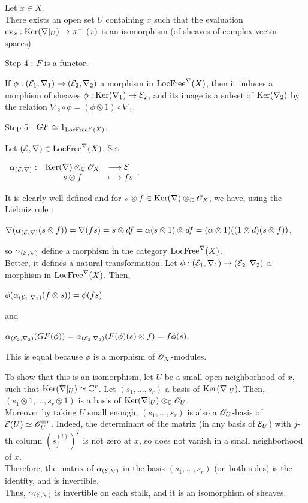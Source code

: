 \begin{mydemo}
\begin{mylemme}
Let $x \in X$.\\
There exists an open set $U$ containing $x$ such that the evaluation $\text{ev}_x : \text{Ker}(\nabla|_U) \to \pi^{-1}(x)$ is an isomorphism (of sheaves of complex vector spaces).
\end{mylemme}


\underline{Step 4} : $F$ is a functor.

\smallskip
If $\phi : (\mathcal{E}_1,\nabla_1) \to (\mathcal{E}_2,\nabla_2)$ a morphism in $\text{LocFree}^\nabla(X)$, then it induces a morphism of sheaves $\phi : \text{Ker}(\nabla_1) \to \mathcal{E}_2$, and its image is a subset of $\text{Ker}(\nabla_2)$ by the relation $\nabla_2 \circ \phi = (\phi\otimes 1)\circ \nabla_1$.


\underline{Step 5} : $GF \simeq 1_{\text{LocFree}^\nabla(X)}$.

\smallskip
Let $(\mathcal{E},\nabla) \in \text{LocFree}^\nabla(X)$. Set
\begin{center}
$\displaystyle \begin{array}{rcll} \alpha_{(\mathcal{E},\nabla)} : & \text{Ker}(\nabla) \otimes_{\mathbb{C}} \mathscr{O}_X & \longrightarrow \mathcal{E} \\ & s \otimes f & \longmapsto fs \end{array}$.
\end{center}
It is clearly well defined and for $s \otimes f \in \text{Ker}(\nabla) \otimes_{\mathbb{C}} \mathscr{O}_X$, we have, using the Liebniz rule :
\begin{center}
$\nabla(\alpha_{(\mathcal{E},\nabla)}(s \otimes f))=\nabla(fs) = s \otimes df = \alpha(s \otimes 1)\otimes df = (\alpha\otimes 1)((1 \otimes d)(s \otimes f))$,
\end{center}
so $\alpha_{(\mathcal{E},\nabla)}$ define a morphism in the category $\text{LocFree}^\nabla(X)$.\\
Better, it defines a natural transformation. Let $\phi :(\mathcal{E}_1,\nabla_1)\to(\mathcal{E}_2,\nabla_2)$ a morphism in $\text{LocFree}^\nabla(X)$. Then,
\begin{center}
$\phi(\alpha_{(\mathcal{E}_1,\nabla_1)}(f\otimes s)) = \phi(fs)$
\end{center}
and
\begin{center}
$\alpha_{(\mathcal{E}_2,\nabla_2)}(GF(\phi)) = \alpha_{(\mathcal{E}_2,\nabla_2)}(F(\phi)(s)\otimes f) = f\phi(s)$.
\end{center}
This is equal because $\phi$ is a morphism of $\mathscr{O}_X$-modules.
\smallskip

To show that this is an isomorphism, let $U$ be a small open neighborhood of $x$, such that $\text{Ker}(\nabla|_U) \simeq \mathbb{C}^r$. Let $(s_1,\dots,s_r)$ a basis of $\text{Ker}(\nabla|_U)$. Then, $(s_1 \otimes 1,\dots, s_r \otimes 1)$ is a basis of $\text{Ker}(\nabla|_U) \otimes_{\mathbb{C}} \mathscr{O}_U$.\\
Moreover by taking $U$ small enough, $(s_1,\dots,s_r)$ is also a $\mathscr{O}_U$-basis of $\mathcal{E}(U) \simeq \mathscr{O}_U^{\oplus r}$. Indeed, the determinant of the matrix (in any basis of $\mathcal{E}_U$) with $j$-th column $(s_j^{(i)})^T$ is not zero at $x$, so does not vanish in a small neighborhood of $x$.\\
Therefore, the matrix of $\alpha_{(\mathcal{E},\nabla)}$ in the basis $(s_1,\dots,s_r)$ (on both sides) is the identity, and is invertible.\\
Thus, $\alpha_{(\mathcal{E},\nabla)}$ is invertible on each stalk, and it is an isomorphism of sheaves.


\end{mydemo}
